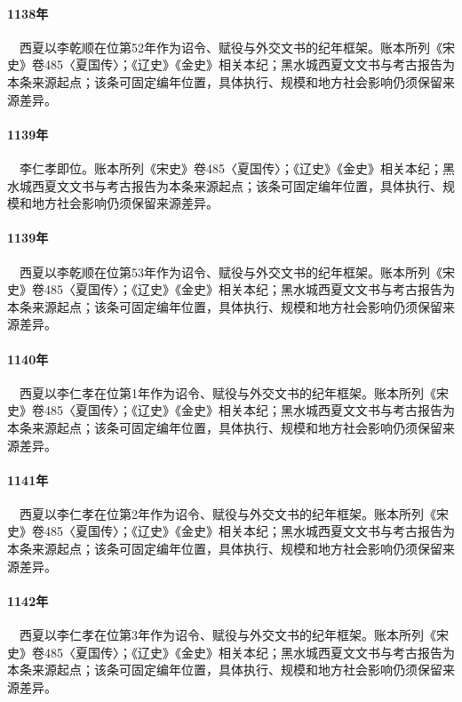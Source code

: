 \paragraph{1138年}　西夏以李乾顺在位第52年作为诏令、赋役与外交文书的纪年框架。账本所列《宋史》卷485〈夏国传〉；《辽史》《金史》相关本纪；黑水城西夏文文书与考古报告为本条来源起点；该条可固定编年位置，具体执行、规模和地方社会影响仍须保留来源差异。

\paragraph{1139年}　李仁孝即位。账本所列《宋史》卷485〈夏国传〉；《辽史》《金史》相关本纪；黑水城西夏文文书与考古报告为本条来源起点；该条可固定编年位置，具体执行、规模和地方社会影响仍须保留来源差异。

\paragraph{1139年}　西夏以李乾顺在位第53年作为诏令、赋役与外交文书的纪年框架。账本所列《宋史》卷485〈夏国传〉；《辽史》《金史》相关本纪；黑水城西夏文文书与考古报告为本条来源起点；该条可固定编年位置，具体执行、规模和地方社会影响仍须保留来源差异。

\paragraph{1140年}　西夏以李仁孝在位第1年作为诏令、赋役与外交文书的纪年框架。账本所列《宋史》卷485〈夏国传〉；《辽史》《金史》相关本纪；黑水城西夏文文书与考古报告为本条来源起点；该条可固定编年位置，具体执行、规模和地方社会影响仍须保留来源差异。

\paragraph{1141年}　西夏以李仁孝在位第2年作为诏令、赋役与外交文书的纪年框架。账本所列《宋史》卷485〈夏国传〉；《辽史》《金史》相关本纪；黑水城西夏文文书与考古报告为本条来源起点；该条可固定编年位置，具体执行、规模和地方社会影响仍须保留来源差异。

\paragraph{1142年}　西夏以李仁孝在位第3年作为诏令、赋役与外交文书的纪年框架。账本所列《宋史》卷485〈夏国传〉；《辽史》《金史》相关本纪；黑水城西夏文文书与考古报告为本条来源起点；该条可固定编年位置，具体执行、规模和地方社会影响仍须保留来源差异。

